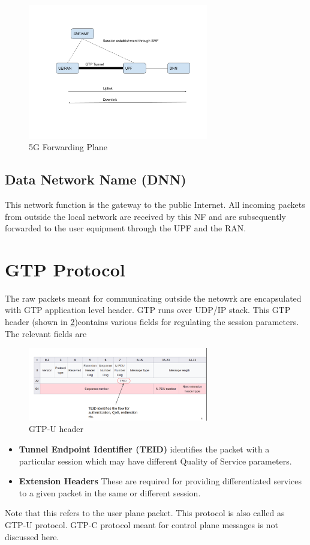  \begin{figure}[htbp]
    \centering
    \includegraphics[width=0.7\textwidth, keepaspectratio]{./fig/Introduction/5GFirst.png}
    \caption{5G Forwarding Plane}
    \label{fig5Gforwarding}
\end{figure}
\subsection{Data Network Name (DNN)}
This network function is the gateway to the public Internet. All incoming packets from outside the
 local network are received by this NF and are subsequently forwarded to the user equipment through
   the UPF and the RAN. 

\section {GTP Protocol\label{secGTP}}
The raw packets meant for communicating outside the netowrk are encapsulated with GTP  application level 
header. GTP runs over UDP/IP stack. This GTP header  (shown in \ref{figGTPheader})contains various fields for regulating the
 session parameters. The relevant fields are
 \begin{figure}[htbp]
    \centering
    \includegraphics[width=0.7\textwidth, keepaspectratio]{./fig/Introduction/intro2.png}
    \caption{GTP-U header \cite{gtpwiki}}
    \label{figGTPheader}
\end{figure}
 \begin{itemize}
    \item \textbf{Tunnel Endpoint Identifier (TEID)} identifies the packet with a particular session which may have different Quality of Service parameters.
    \item \textbf{Extension Headers} These are required for providing differentiated services to  a given packet in the same or different session.
 \end{itemize}
Note that this refers to the user plane packet. This protocol is also called as GTP-U protocol. GTP-C protocol meant for control plane messages is not discussed here. 
